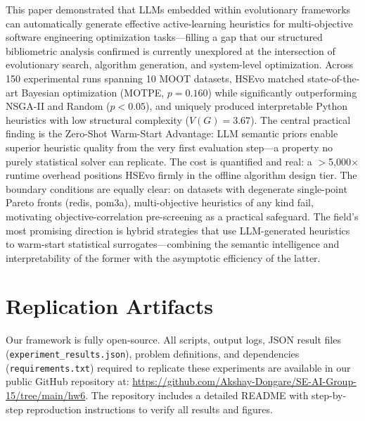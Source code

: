 \documentclass[sigconf,nonacm]{acmart}
\begin{document}
This paper demonstrated that LLMs embedded within evolutionary
frameworks can automatically generate effective active-learning
heuristics for multi-objective software engineering optimization
tasks---filling a gap that our structured bibliometric analysis
confirmed is currently unexplored at the intersection of
evolutionary search, algorithm generation, and system-level
optimization. Across 150 experimental runs spanning 10 MOOT
datasets, HSEvo matched state-of-the-art Bayesian optimization
(MOTPE, $p = 0.160$) while significantly outperforming NSGA-II
and Random ($p < 0.05$), and uniquely produced interpretable
Python heuristics with low structural complexity ($V(G) = 3.67$).
The central practical finding is the Zero-Shot Warm-Start
Advantage: LLM semantic priors enable superior heuristic quality
from the very first evaluation step---a property no purely
statistical solver can replicate. The cost is quantified and
real: a $>$5{,}000$\times$ runtime overhead positions HSEvo
firmly in the offline algorithm design tier. The boundary 
conditions are equally clear: on datasets with degenerate 
single-point Pareto fronts (redis, pom3a), multi-objective 
heuristics of any kind fail, motivating objective-correlation 
pre-screening as a practical safeguard. The field's most 
promising direction is hybrid strategies that use LLM-generated 
heuristics to warm-start statistical surrogates—combining the 
semantic intelligence and interpretability of the former with the 
asymptotic efficiency of the latter.

\section{Replication Artifacts}

Our framework is fully open-source. All scripts, output logs, JSON result files (\texttt{experiment\_results.json}), problem definitions, and dependencies (\texttt{requirements.txt}) required to replicate these experiments are available in our public GitHub repository at: \url{https://github.com/Akshay-Dongare/SE-AI-Group-15/tree/main/hw6}. The repository includes a detailed README with step-by-step reproduction instructions to verify all results and figures.

\nocite{*}


\end{document}
